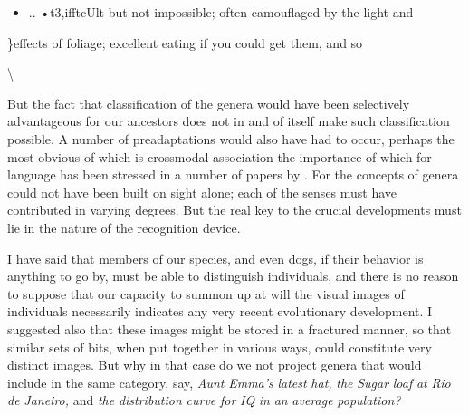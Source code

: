 \begin{itemize}
\item .. •t3,ifftcUlt but not impossible; often camouflaged by the light-and\-
\end{itemize}

\}effects of foliage; excellent eating if you could get them, and so

{\textbackslash}


But the fact that classification of the genera would have been selectively advantageous for our ancestors does not in and of itself make such classification possible. A number of preadaptations would also have had to occur, perhaps the most obvious of which is cross\-modal association-the importance of which for language has been stressed in a number of papers by \citet{Geschwind1974}. For the concepts of genera could not have been built on sight alone; each of the senses must have contributed in varying degrees. But the real key to the crucial developments must lie in the nature of the recognition device.

I have said that members of our species, and even dogs, if their behavior is anything to go by, must be able to distinguish individuals, and there is no reason to suppose that our capacity to summon up at will the visual images of individuals necessarily indicates any very recent evolutionary development. I suggested also that these images might be stored in a fractured manner, so that similar sets of bits, when put together in various ways, could constitute very distinct images. But why in that case do we not project genera that would include in the same category, say, \textit{Aunt} \textit{Emma's} \textit{latest} \textit{hat,} \textit{the} \textit{Sugar\-} \textit{loaf} \textit{at} \textit{Rio} \textit{de} \textit{Janeiro,} and \textit{the} \textit{distribution} \textit{curve} \textit{for} \textit{IQ} \textit{in} \textit{an} \textit{average} \textit{population?}


